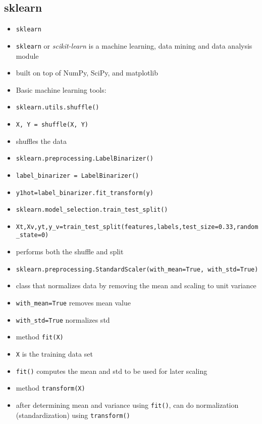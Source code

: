 \documentclass[onecolumn]{IEEEtran} %
\begin{document}
\subsection{sklearn}
\begin{itemize}
    \item \verb|sklearn|
    \bi
        \item \verb|sklearn| or \emph{scikit-learn} is a machine learning, data mining and data analysis module
        \item built on top of NumPy, SciPy, and matplotlib
    \ei
    \item Basic machine learning tools:
    \bi
        \item \verb|sklearn.utils.shuffle()|
        \bi
            \item \verb|X, Y = shuffle(X, Y)|
            \item shuffles the data
        \ei
        \item \verb|sklearn.preprocessing.LabelBinarizer()|
        \bi
            \item \verb|label_binarizer = LabelBinarizer()|
            \item \verb|y1hot=label_binarizer.fit_transform(y)|
        \ei
        \item \verb|sklearn.model_selection.train_test_split()|
        \bi
            \item \verb|Xt,Xv,yt,y_v=train_test_split(features,labels,test_size=0.33,random_state=0)|
            \item  performs both the shuffle and split
        \ei
        \item \verb|sklearn.preprocessing.StandardScaler(with_mean=True, with_std=True)|
        \bi
            \item class that normalizes data by removing the mean and scaling to unit variance
            \item \verb|with_mean=True| removes mean value
            \item \verb|with_std=True| normalizes std
            \item method \verb|fit(X)|
            \bi
                \item \verb|X| is the training data set
                \item \verb|fit()| computes the mean and std to be used for later scaling
            \ei
            \item method \verb|transform(X)|
            \bi
                \item after determining mean and variance using \verb|fit()|, can do normalization (standardization) using \verb|transform()|
            \ei


\end{itemize}
\end{document}

